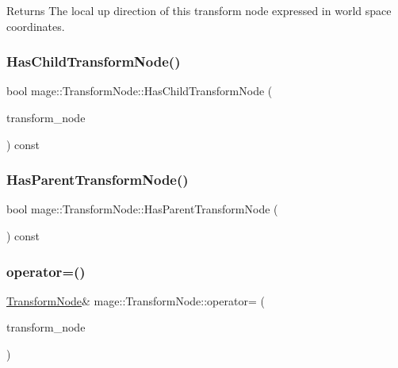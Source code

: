 \begin{DoxyReturn}{Returns}
The local up direction of this transform node expressed in world space coordinates. 
\end{DoxyReturn}
\hypertarget{classmage_1_1_transform_node_a372546863845853cd06f2f812b8c85ce}{}\label{classmage_1_1_transform_node_a372546863845853cd06f2f812b8c85ce} 
\subsubsection{\texorpdfstring{Has\+Child\+Transform\+Node()}{HasChildTransformNode()}}
{\footnotesize\ttfamily bool mage\+::\+Transform\+Node\+::\+Has\+Child\+Transform\+Node (\begin{DoxyParamCaption}\item[{\hyperlink{namespacemage_a1e01ae66713838a7a67d30e44c67703e}{Shared\+Ptr}$<$ const \hyperlink{classmage_1_1_transform_node}{Transform\+Node} $>$}]{transform\+\_\+node }\end{DoxyParamCaption}) const}

\hypertarget{classmage_1_1_transform_node_a3a2b75bf672e149dac54887f9e2552b3}{}\label{classmage_1_1_transform_node_a3a2b75bf672e149dac54887f9e2552b3} 
\subsubsection{\texorpdfstring{Has\+Parent\+Transform\+Node()}{HasParentTransformNode()}}
{\footnotesize\ttfamily bool mage\+::\+Transform\+Node\+::\+Has\+Parent\+Transform\+Node (\begin{DoxyParamCaption}{ }\end{DoxyParamCaption}) const}

\hypertarget{classmage_1_1_transform_node_a1514dd4dc3ca63725ead2a196b2c6c89}{}\label{classmage_1_1_transform_node_a1514dd4dc3ca63725ead2a196b2c6c89} 
\subsubsection{\texorpdfstring{operator=()}{operator=()}\hspace{0.1cm}{\footnotesize\ttfamily [1/2]}}
{\footnotesize\ttfamily \hyperlink{classmage_1_1_transform_node}{Transform\+Node}\& mage\+::\+Transform\+Node\+::operator= (\begin{DoxyParamCaption}\item[{const \hyperlink{classmage_1_1_transform_node}{Transform\+Node} \&}]{transform\+\_\+node }\end{DoxyParamCaption})\hspace{0.3cm}{\ttfamily [delete]}}

